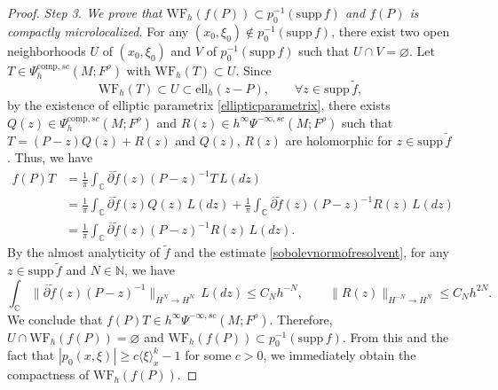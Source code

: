 \documentclass[11pt,oneside,reqno]{amsart}
\newcommand\C{\ensuremath{\mathbb{C}}}
\theoremstyle{definition}
\numberwithin{equation}{section}
\theoremstyle{plain}
\begin{document}
\begin{proof}
\emph{Step 3. We prove that $\mathrm{WF}_{h}(f(P))\subset p_{0}^{-1}(\mathrm{supp}\,f)$ and $f(P)$ is compactly microlocalized.}  For any $(x_0,\xi_0)\notin p_{0}^{-1}(\mathrm{supp}\,f)$, there exist two open neighborhoods $U$ of $(x_0,\xi_0)$ and $V$ of $p_{0}^{-1}(\mathrm{supp}\,f)$ such that $U \cap V=\varnothing$. Let $T \in \Psi^{\mathrm{comp},sc}_{h}(M;F^\rho)$ with $\mathrm{WF}_{h}(T)\subset U$. Since 
\begin{equation*}
    \mathrm{WF}_{h}(T)\subset U\subset \mathrm{ell}_{h}(z-P), \qquad \forall z \in \mathrm{supp}\,\widetilde{f},
\end{equation*}
by the existence of elliptic parametrix \eqref{ellipticparametrix}, there exists $Q(z)\in \Psi^{\mathrm{comp},sc}_{h}(M;F^\rho)$ and $R(z)\in h^{\infty}\Psi^{-\infty,sc}(M;F^\rho)$ such that $T=(P-z)Q(z)+R(z)$ and $Q(z),\,R(z)$ are holomorphic for $z \in \mathrm{supp}\,\widetilde{f}$. Thus, we have
\begin{equation}
\begin{aligned}
f(P)T&=\frac{1}{\pi}\int_{\C}\overline{\partial}\widetilde{f}(z)(P-z)^{-1}T \, L(dz)\\
&=\frac{1}{\pi}\int_{\C}\overline{\partial}\widetilde{f}(z)Q(z)\,L(dz) + \frac{1}{\pi}\int_{\C}\overline{\partial}\widetilde{f}(z)(P-z)^{-1}R(z)\,L(dz)\\
&=\frac{1}{\pi}\int_{\C}\overline{\partial}\widetilde{f}(z)(P-z)^{-1}R(z)\, L(dz).
\end{aligned}
\end{equation}
By the almost analyticity of $\widetilde{f}$ and the estimate \eqref{sobolevnormofresolvent}, for any $z \in \mathrm{supp}\,\widetilde{f}$ and $N\in \mathbb{N}$, we have
\begin{equation*}
    \int_{\C}\|\overline{\partial}\widetilde{f}(z)(P-z)^{-1}\|_{H^N\to H^{N}}\,L(dz) \leq C_Nh^{-N},\qquad \|R(z)\|_{H^{-N}\to H^{N}}\leq C_Nh^{2N}.
\end{equation*}
We conclude that $f(P)T \in h^{\infty}\Psi^{-\infty,sc}(M;F^\rho)$. Therefore, $U\cap \mathrm{WF}_{h}(f(P))=\varnothing$ and $\mathrm{WF}_{h}(f(P))\subset p_0^{-1}(\mathrm{supp}\,f)$. From this and the fact that $|p_{0}(x,\xi)|\geq c\langle \xi \rangle_{x}^k-1$ for some $c>0$, we immediately obtain the compactness of $\mathrm{WF}_{h}(f(P))$.
\end{proof}
\end{document}
